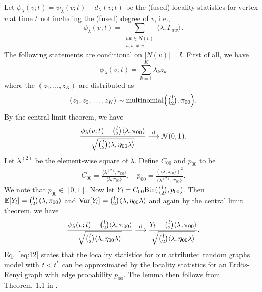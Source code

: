 \documentclass[10pt,journal,compsoc]{IEEEtran}
\theoremstyle{definition}
\begin{document}
\begin{IEEEproof}[Lemma~7]
Let $\phi_{\lambda}(v;t) = \psi_{\lambda}(v;t) - d_{\lambda}(v;t)$ be
the (fused) locality statistics for
vertex $v$ at time $t$ not including the (fused) degree of $v$, i.e.,
\begin{equation}
  \label{eq:11}
  \phi_{\lambda}(v;t) = \sum_{\substack{uw
      \in N(v) \\ u,w \not = v}} \langle \lambda,
  \Gamma_{uw} \rangle.
\end{equation}
The following statements are conditional on $|N(v)| = l$. First
of all, we have
\begin{equation*}
  \phi_{\lambda}(v;t) = \sum_{k=1}^{K}{\lambda_k z_k}
\end{equation*}
where the $(z_1, \dots, z_K)$ are distributed as
\begin{gather*}
  (z_1,z_2,\dots,z_K) \sim \textrm{multinomial}\Bigl(
  \tbinom{l}{2}, \pi_{00}\Bigr). 
\end{gather*}
By the central limit theorem, we have
\begin{equation*}
  \frac{\phi_\lambda(v;t) - \tbinom{l}{2} \langle \lambda, \pi_{00}
    \rangle}{\sqrt{\tbinom{l}{2} \langle \lambda, \eta_{00} \lambda \rangle}}
  \overset{\mathrm{d}}{\longrightarrow} \mathcal{N}(0,1).
\end{equation*}
Let $\lambda^{(2)}$ be the element-wise square of $\lambda$. Define
$C_{00}$ and $p_{00}$ to be 
 \begin{gather}
   \label{eq:26}
   C_{00} = \tfrac{\langle \lambda^{(2)}, \pi_{00} \rangle}{\langle \lambda,
     \pi_{00}\rangle}, \quad p_{00} = \tfrac{(\langle \lambda, \pi_{00}
     \rangle)^{2}}{\langle \lambda^{(2)},\, \pi_{00} \rangle}.
 \end{gather}
 We note that $p_{00} \in [0,1]$. Now let $Y_{l} = C_{00}
 \mathrm{Bin}(\tbinom{l}{2}, p_{00})$. Then $\mathbb{E}[Y_l] =
 \tbinom{l}{2} \langle \lambda, \pi_{00} \rangle$ and
 $\mathrm{Var}[Y_l] = \tbinom{l}{2} \langle \lambda, \eta_{00} \lambda
 \rangle$ and again by the central limit theorem, we have
\begin{equation}
  \label{eq:12}
  \frac{\psi_{\lambda}(v;t) - \tbinom{l}{2} \langle \lambda, \pi_{00}
    \rangle}{\sqrt{\tbinom{l}{2} \langle \lambda, \eta_{00} \lambda
      \rangle}}   \overset{\mathrm{d}}{\longrightarrow} \frac{Y_l -
    \tbinom{l}{2} \langle \lambda, \pi_{00} \rangle}{\sqrt{\tbinom{l}{2}
    \langle \lambda, \eta_{00} \lambda \rangle}}.
\end{equation}
Eq.~\eqref{eq:12} states that the locality statistics for our
attributed random graphs model with $t < t^{*}$
can be approximated by the locality statistics for an Erd\"{o}s-Renyi
graph with edge probability $p_{00}$. The lemma then follows
from Theorem~1.1 in \cite{rukhin:_limit_distr_graph_scan_statis}.
\end{IEEEproof}
\end{document}
